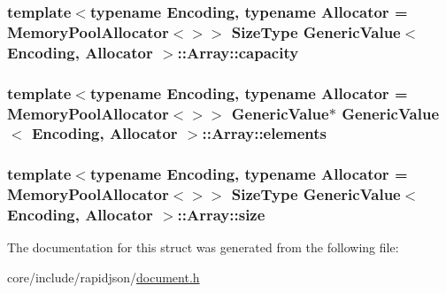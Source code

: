 \subsubsection[{\texorpdfstring{capacity}{capacity}}]{\setlength{\rightskip}{0pt plus 5cm}template$<$typename Encoding, typename Allocator = Memory\+Pool\+Allocator$<$$>$$>$ {\bf Size\+Type} {\bf Generic\+Value}$<$ Encoding, Allocator $>$\+::Array\+::capacity}\hypertarget{structGenericValue_1_1Array_a2f5dfb089ee750e9405d5adeda4df894}{}\label{structGenericValue_1_1Array_a2f5dfb089ee750e9405d5adeda4df894}
\subsubsection[{\texorpdfstring{elements}{elements}}]{\setlength{\rightskip}{0pt plus 5cm}template$<$typename Encoding, typename Allocator = Memory\+Pool\+Allocator$<$$>$$>$ {\bf Generic\+Value}$\ast$ {\bf Generic\+Value}$<$ Encoding, Allocator $>$\+::Array\+::elements}\hypertarget{structGenericValue_1_1Array_a0af8e50f37486f042ab19fd871d11d4f}{}\label{structGenericValue_1_1Array_a0af8e50f37486f042ab19fd871d11d4f}
\subsubsection[{\texorpdfstring{size}{size}}]{\setlength{\rightskip}{0pt plus 5cm}template$<$typename Encoding, typename Allocator = Memory\+Pool\+Allocator$<$$>$$>$ {\bf Size\+Type} {\bf Generic\+Value}$<$ Encoding, Allocator $>$\+::Array\+::size}\hypertarget{structGenericValue_1_1Array_a60f69b3b57b86c20c123c1b080e34bcc}{}\label{structGenericValue_1_1Array_a60f69b3b57b86c20c123c1b080e34bcc}


The documentation for this struct was generated from the following file\+:\begin{DoxyCompactItemize}
\item 
core/include/rapidjson/\hyperlink{document_8h}{document.\+h}\end{DoxyCompactItemize}
